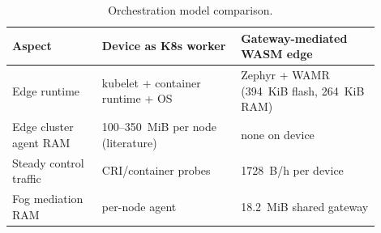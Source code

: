 \begin{table}[t]
\centering
\caption{Orchestration model comparison.}
\label{tab:arch-compare}
\footnotesize
\setlength{\tabcolsep}{3pt}
\begin{tabular}{p{0.22\linewidth} p{0.34\linewidth} p{0.34\linewidth}}
\toprule
\textbf{Aspect} & \textbf{Device as K8s worker} & \textbf{Gateway-mediated WASM edge} \\
\midrule
Edge runtime & kubelet + container runtime + OS & Zephyr + WAMR (394~KiB flash, 264~KiB RAM) \\
Edge cluster agent RAM & 100--350~MiB per node (literature) & none on device \\
Steady control traffic & CRI/container probes & 1728~B/h per device \\
Fog mediation RAM & per-node agent & 18.2~MiB shared gateway \\
\bottomrule
\end{tabular}
\end{table}

\FloatBarrier
